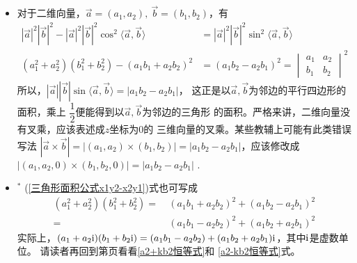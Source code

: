 \begin{itemize}[leftmargin=\inteval{\myitemleftmargin}pt,itemsep=
   \inteval{\myitemitempsep}pt,topsep=\inteval{\myitemtopsep}pt]
\item 对于二维向量，$ \vec{a}=(a_1,a_2),\ \vec{b}=(b_1,b_2) $，有
\begin{align}
    |\vec{a}|^2|\vec{b}|^2-|\vec{a}|^2|\vec{b}|^2
    \cos^2\langle\vec{a},\vec{b}\rangle 
    &=|\vec{a}|^2|\vec{b}|^2\sin^2\langle\vec{a},\vec{b}\rangle \nonumber\\
    (a_1^2+a_2^2)(b_1^2+b_2^2)-(a_1b_1+a_2b_2)^2 &=
    (a_1b_2-a_2b_1)^2=
    \begin{vmatrix}
        a_{1} & a_{2} \\
        b_{1} & b_{2}
    \end{vmatrix}
    ^2 \label{三角形面积公式x1y2-x2y1}
\end{align}
所以，$ |\vec{a}||\vec{b}|\sin\langle\vec{a},\vec{b}
\rangle=|a_1b_2-a_2b_1| $，
这正是以$ \vec{a},\vec{b} $为邻边的平行四边形的面积，乘上
$ \dfrac{1}{2} $便能得到以$ \vec{a},\vec{b} $为邻边的三角形
的面积。严格来讲，二维向量没有叉乘，应该表述成$ z $坐标为0的
三维向量的叉乘。某些教辅上可能有此类错误写法
$ |\vec{a}\times\vec{b}|=|(a_1,a_2)\times (b_1,b_2)|=
|a_1b_2-a_2b_1| $，应该修改成
$ |(a_1,a_2,0)\times (b_1,b_2,0)|=|a_1b_2-a_2b_1| $ . 

\item $^*$ (\ref{三角形面积公式x1y2-x2y1})式也可写成
\begin{align} 
    (a_1^2+a_2^2)(b_1^2+b_2^2)=&\  (a_1b_1+a_2b_2)^2+
    (a_1b_2-a_2b_1)^2 \\
    =&\  (a_1b_1-a_2b_2)^2+(a_1b_2+a_2b_1)^2 
\end{align}
实际上，$ (a_1+a_2 \mathrm{i})(b_1+b_2 \mathrm{i})=(a_1b_1-a_2b_2)+(a_1b_2+
a_2b_1)\mathrm{i} $，其中$ \mathrm{i} $是虚数单位。
请读者再回到第\pageref{a2+kb2恒等式}页看看\eqref{a2+kb2恒等式}和
\eqref{a2-kb2恒等式}式。


\end{itemize}
